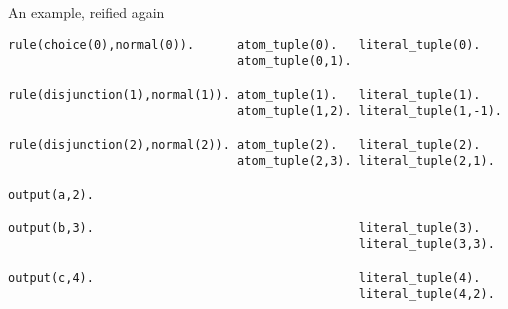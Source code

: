 \begin{frame}[fragile,shrink=28]{An example, reified again}
\bigskip
\begin{lstlisting}
rule(choice(0),normal(0)).      atom_tuple(0).   literal_tuple(0).
                                atom_tuple(0,1).

rule(disjunction(1),normal(1)). atom_tuple(1).   literal_tuple(1).
                                atom_tuple(1,2). literal_tuple(1,-1).

rule(disjunction(2),normal(2)). atom_tuple(2).   literal_tuple(2).
                                atom_tuple(2,3). literal_tuple(2,1).

output(a,2).

output(b,3).                                     literal_tuple(3).
                                                 literal_tuple(3,3).

output(c,4).                                     literal_tuple(4).
                                                 literal_tuple(4,2).
\end{lstlisting}
\end{frame}
